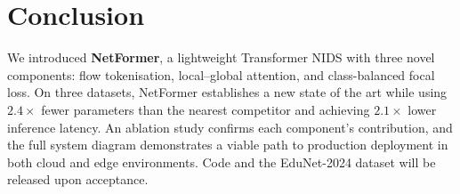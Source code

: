 \documentclass[conference]{IEEEtran}
\begin{document}
\section{Conclusion}
\label{sec:conclusion}

We introduced \textbf{NetFormer}, a lightweight Transformer NIDS
with three novel components: flow tokenisation, local--global
attention, and class-balanced focal loss. On three datasets,
NetFormer establishes a new state of the art while using
$2.4\times$ fewer parameters than the nearest competitor and
achieving $2.1\times$ lower inference latency. An ablation study
confirms each component's contribution, and the full system diagram
demonstrates a viable path to production deployment in both cloud
and edge environments. Code and the EduNet-2024 dataset will be
released upon acceptance.
\end{document}
